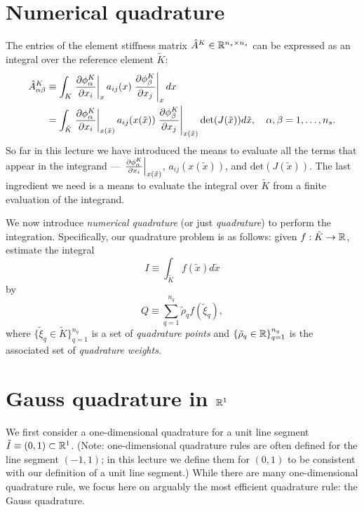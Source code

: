 \section{Numerical quadrature}
The entries of the element stiffness matrix $\hat A^K \in \mathbb{R}^{n_s \times n_s}$ can be expressed as an integral over the reference element $\tilde K$:
\begin{align*}
  \hat A^K_{\alpha\beta}
  &\equiv \int_{K} \left. \frac{\partial \phi_\alpha^K}{\partial x_i} \right|_{x} a_{ij}(x) \left. \frac{\partial \phi_\beta^K}{\partial x_j} \right|_x dx
  \\
  &= \int_{\tilde K} \left. \frac{\partial \phi_\alpha^K}{\partial x_i} \right|_{x(\tilde x)} a_{ij}(x(\tilde x)) \left. \frac{\partial \phi_\beta^K}{\partial x_j} \right|_{x(\tilde x)} \det(J(\tilde x)) d\tilde x , \quad \alpha,\beta = 1,\dots,n_s.
\end{align*}
So far in this lecture we have introduced the means to evaluate all the terms that appear in the integrand --- $\left. \frac{\partial \phi_\alpha^K}{\partial x_i} \right|_{x(\tilde x)}$, $a_{ij}(x(\tilde x))$, and $\text{det}(J(\tilde x))$.  The last ingredient we need is a means to evaluate the integral over $\tilde K$ from a finite evaluation of the integrand.

We now introduce \emph{numerical quadrature} (or just \emph{quadrature}) to perform the integration.  Specifically, our quadrature problem is as follows: given $f: \tilde K \to \mathbb{R}$, estimate the integral
\begin{equation*}
  I \equiv \int_{\tilde K} f(\tilde x) d \tilde x
\end{equation*}
by
\begin{equation*}
  Q \equiv \sum_{q=1}^{n_q} \tilde \rho_q f(\tilde \xi_q),
\end{equation*}
where $\{\tilde \xi_q \in \tilde K \}_{q=1}^{n_q}$ is a set of \emph{quadrature points} and $\{\tilde \rho_q \in \mathbb{R} \}_{q=1}^{n_q}$ is the associated set of \emph{quadrature weights}.

\section{Gauss quadrature in $\mathbb{R}^1$}
We first consider a one-dimensional quadrature for a unit line segment $\tilde I \equiv (0,1) \subset \mathbb{R}^1$.  (Note: one-dimensional quadrature rules are often defined for the line segment $(-1,1)$; in this lecture we define them for $(0,1)$ to be consistent with our definition of a unit line segment.)  While there are many one-dimensional quadrature rule, we focus here on arguably the most efficient quadrature rule: the Gauss quadrature.

